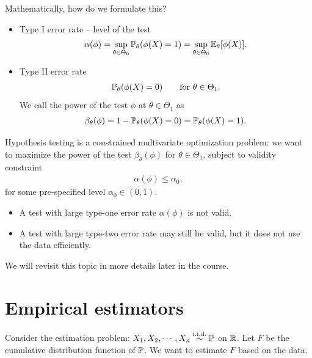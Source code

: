 \documentclass[11pt,letterpaper]{article}
\numberwithin{assumption}{lecture}
\numberwithin{theorem}{lecture}
\numberwithin{proposition}{lecture}
\numberwithin{lemma}{lecture}
\numberwithin{claim}{lecture}
\numberwithin{corollary}{lecture}
\numberwithin{definition}{lecture}
\numberwithin{conjecture}{lecture}
\numberwithin{remark}{lecture}
\numberwithin{example}{lecture}
\numberwithin{equation}{lecture}
\begin{document}
Mathematically, how do we formulate this?
\begin{itemize}
  \item Type I error rate -- level of the test
  \begin{align*}
    \alpha(\phi) = \sup_{\theta \in \Theta_0} {\mathbb{P}}_\theta(\phi(X) = 1) = \sup_{\theta \in \Theta_0} {\mathbb{E}}_\theta[\phi(X)].
  \end{align*}
  \item Type II error rate
  \begin{align*}
    {\mathbb{P}}_\theta (\phi (X) = 0) \qquad \mbox{for }\theta \in \Theta_1.
  \end{align*}
  We call the power of the test $\phi$ at $\theta \in \Theta_1$ as
  \begin{align*}
    \beta_\theta(\phi) = 1 - {\mathbb{P}}_\theta (\phi (X) = 0) = {\mathbb{P}}_\theta (\phi (X) = 1).
  \end{align*}
\end{itemize}
Hypothesis testing is a constrained multivariate optimization problem: we want to maximize the power of the test $\beta_\theta(\phi)$ for $\theta \in \Theta_1$, subject to validity constraint
\begin{align*}
  \alpha (\phi) \leq \alpha_0,
\end{align*}
for some pre-specified level $\alpha_0 \in (0,1)$.

\begin{itemize}
  \item A test with large type-one error rate $\alpha(\phi)$ is not valid.
  \item A test with large type-two error rate may still be valid, but it does not use the data efficiently.
\end{itemize}
We will revisit this topic in more details later in the course.

\section{Empirical estimators}
Consider the estimation problem:
$X_1, X_2, \cdots, X_n \overset{\mathrm{i.i.d.}}{\sim} {\mathbb{P}}$ on $\mathbb{R}$. Let $F$ be the cumulative distribution function of ${\mathbb{P}}$. We want to estimate $F$ based on the data.
\end{document}
